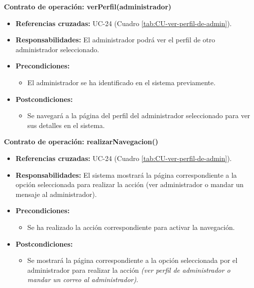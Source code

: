 \textbf{Contrato de operación: verPerfil(administrador)}
\begin{itemize}
\item \textbf{Referencias cruzadas:} UC-24 (Cuadro \ref{tab:CU-ver-perfil-de-admin}).
\item \textbf{Responsabilidades:} El administrador podrá ver el perfil de otro administrador seleccionado.
\item \textbf{Precondiciones:} 
 \begin{itemize}
\item El administrador se ha identificado en el sistema previamente.
\end {itemize}
\item \textbf{Postcondiciones:} 
 \begin{itemize}
\item Se navegará a la página del perfil del administrador seleccionado para ver sus detalles en el sistema.
\end {itemize}
\end {itemize}

\textbf{Contrato de operación: realizarNavegacion()}
\begin{itemize}
\item \textbf{Referencias cruzadas:} UC-24 (Cuadro \ref{tab:CU-ver-perfil-de-admin}).
\item \textbf{Responsabilidades:} El sistema mostrará la página correspondiente a la opción seleccionada para realizar la acción (ver administrador o mandar un mensaje al administrador).
\item \textbf{Precondiciones:} 
 \begin{itemize}
\item Se ha realizado la acción correspondiente para activar la navegación.
\end {itemize}
\item \textbf{Postcondiciones:} 
 \begin{itemize}
\item Se mostrará la página correspondiente a la opción seleccionada por el administrador para realizar la acción \textit{(ver perfil de administrador o mandar un correo al administrador)}.
\end {itemize}
\end {itemize}

\vspace{10mm}

